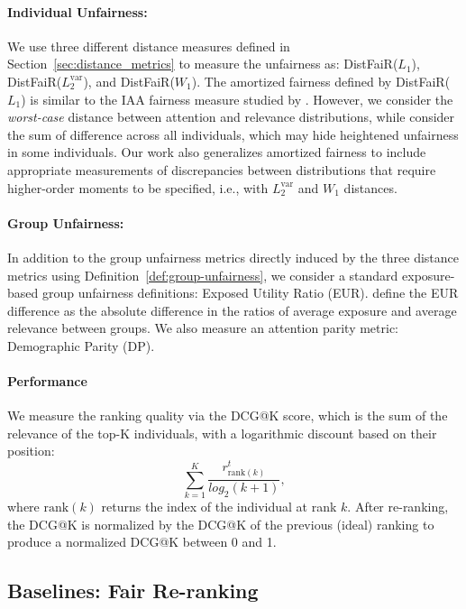 \paragraph{Individual Unfairness:} We use three different distance measures defined in Section~\ref{sec:distance_metrics} to measure the unfairness as:  DistFaiR($L_1$), DistFaiR($L_2^{\text{var}}$), and DistFaiR($W_1$).
The amortized fairness defined by DistFaiR($L_1$) is similar to the IAA fairness measure studied by \cite{biega2018equity}. However, we consider the \emph{worst-case} distance between attention and relevance distributions, while \cite{biega2018equity} consider the sum of difference across all individuals, which may hide heightened unfairness in some individuals. Our work also generalizes amortized fairness to include appropriate measurements of discrepancies between distributions that require higher-order moments to be specified, i.e., with $L_2^{\text{var}}$ and $W_1$ distances.



\paragraph{Group Unfairness:}
In addition to the group unfairness metrics directly induced by the three distance metrics using Definition~\ref{def:group-unfairness}, we consider a standard exposure-based group unfairness definitions: Exposed Utility Ratio (EUR). \cite{singh2018fairness,morik2020controlling} define the EUR difference as the absolute difference in the ratios of average exposure and average relevance between groups. We also measure an attention parity metric: Demographic Parity\cite{morik2020controlling} (DP). 


\paragraph{Performance}
\label{sec:perf}
We measure the ranking quality via the DCG@K score, which is the sum of the relevance of the top-K individuals, with a logarithmic discount based on their position: 
$$\sum_{k=1}^{K}\frac{r_{\text{rank}(k)}^t}{log_2(k+1)},$$
where ${\text{rank}(k)}$ returns the index of the individual at rank $k$. After re-ranking, the DCG@K is normalized by the DCG@K of the previous (ideal) ranking to produce a normalized DCG@K between 0 and 1. 


\subsection{Baselines: Fair Re-ranking }

